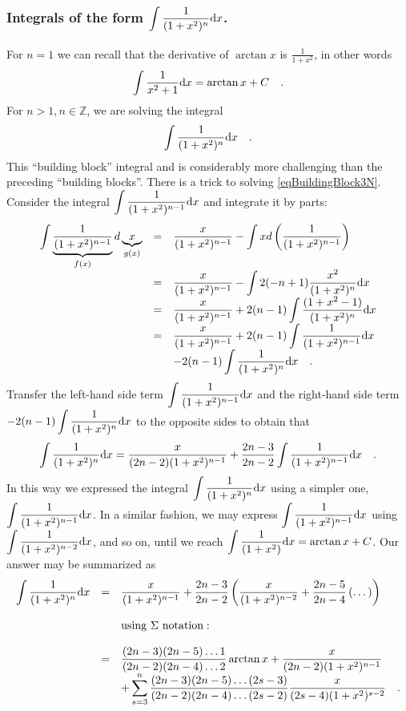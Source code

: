 \documentclass[12pt]{book}
\begin{document}
\subsubsection {Integrals of the form $\displaystyle\int \frac{1}{(1+x ^2)^n} {\normalfont \text{d}} x $.}
For $n=1$ we can recall that the derivative of $\arctan x$ is $\displaystyle\frac{1}{1+x^2}$, in other words
\[
\int \frac{1}{x^2+1}{\normalfont \text{d}} x= \arctan x+C\quad .
\]
For $n>1, n\in \mathbb Z$, we are solving the integral
\begin{equation}\label{eqBuildingBlock3N}
\int \frac{1}{(1+x ^2)^n}{\normalfont \text{d}} x\quad .
\end{equation}
This ``building block'' integral and is considerably more challenging than the preceding ``building blocks''. There is a trick to solving \eqref{eqBuildingBlock3N}. Consider the integral $\displaystyle\int \frac{1}{(1+x ^2)^{n-1}}{\normalfont \text{d}} x$ and integrate it by parts:
\[
\begin{array}{rcl}
\displaystyle \int \underbrace{\frac{1}{(1+x ^2)^{n-1}}}_{f(x)}d\underbrace{x}_{g(x)}&=&\displaystyle \frac{x}{(1+x ^2)^{n-1}}-\int x d\left(\frac{1}{(1+x ^2)^{n-1}}\right)\\
&=&\displaystyle\frac{x}{(1+x ^2)^{n-1}}- \int 2(-n+1)\frac{x^2}{(1+x^2)^n}{\normalfont \text{d}} x\\
&=&\displaystyle\frac{x}{(1+x ^2)^{n-1}}+2(n-1) \int \frac{(1+x^2-1)}{(1+x^2)^n}{\normalfont \text{d}} x\\
&=&\displaystyle\frac{x}{(1+x ^2)^{n-1}} +2(n-1)\int \frac{1}{(1+x^2)^{n-1}}{\normalfont \text{d}} x \\&&\displaystyle -2(n-1) \int \frac{1}{(1+x^2)^n}{\normalfont \text{d}} x\quad .
\end{array}
\]
Transfer the left-hand side term $\displaystyle\int \frac{1}{(1+x^2)^{n-1}}{\normalfont \text{d}} x$ and the right-hand side term  $\displaystyle -2(n-1) \int \frac{1}{(1+x^2)^n}{\normalfont \text{d}} x$ to the opposite sides to obtain that
\[
\int \frac{1}{(1+x^2)^n}{\normalfont \text{d}} x= \frac{x}{(2n-2)(1+x ^2)^{n-1}}+ \frac{2n-3}{2n-2}\int \frac{1}{(1+x^2)^{n-1}}{\normalfont \text{d}} x\quad .
\]
In this way we expressed the integral $\displaystyle\int \frac{1}{(1+x^2)^n}{\normalfont \text{d}} x$ using a simpler one, $\displaystyle\int \frac{1}{(1+x^2)^{n-1}}{\normalfont \text{d}} x$. In a similar fashion, we may express $\displaystyle\int \frac{1}{(1+x^2)^{n-1}}{\normalfont \text{d}} x$ using $\displaystyle\int \frac{1}{(1+x^2)^{n-2}}{\normalfont \text{d}} x$, and so on, until we reach $\displaystyle\int \frac{1}{(1+x^2)}{\normalfont \text{d}} x=\arctan x +C$. Our answer may be summarized as
\[
\begin{array}{rcl}
\displaystyle \int \frac{1}{(1+x^2)^n}{\normalfont \text{d}} x&=& \displaystyle  \frac{x}{(1+x ^2)^{n-1}}+\frac{2n-3}{2n-2}\left(\frac{x}{(1+x^2)^{n-2}}+\frac{2n-5}{2n-4}\left(\dots\right)\right)\\ \\ &&\mathrm{using~}\Sigma \mathrm{~notation:}\\ \\
&=&\displaystyle \frac{(2n-3 )(2n-5)\dots 1}{(2n-2)(2n-4)\dots 2}\arctan x+  \frac{x}{(2n-2)(1+x ^2)^{n-1}} \\&&\displaystyle + \sum_{s=3}^{n} \frac{(2n-3 )(2n-5)\dots (2s-3)}{(2n-2)(2n-4)\dots (2s-2)} \frac{x}{(2s-4)(1+x^2)^{s-2}} \quad .
\end{array}
\]
\end{document}
